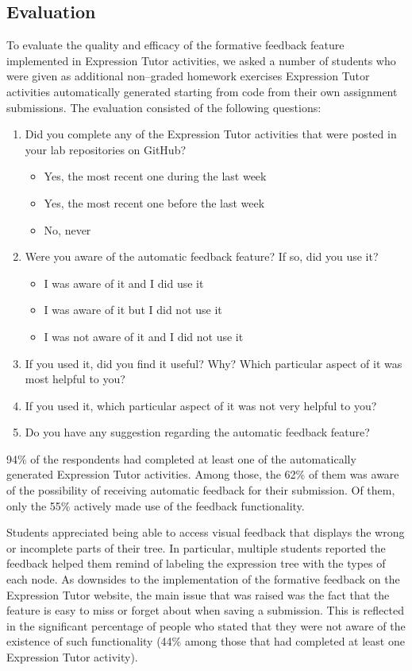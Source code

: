 \begin{chapterBody}
\subsection{Evaluation}

To evaluate the quality and efficacy of the formative feedback feature
implemented in Expression Tutor activities, we asked a number of
students who were given as additional non–graded homework exercises
Expression Tutor activities automatically generated starting from
code from their own assignment submissions.
The evaluation consisted of the following questions:

\begin{enumerate}
    \item Did you complete any of the Expression Tutor activities that
were posted in your lab repositories on GitHub?
    \begin{itemize}
        \item Yes, the most recent one during the last week
        \item Yes, the most recent one before the last week
        \item No, never
    \end{itemize}
    \item Were you aware of the automatic feedback feature? If so,
did you use it?
    \begin{itemize}
        \item I was aware of it and I did use it
        \item I was aware of it but I did not use it
        \item I was not aware of it and I did not use it
    \end{itemize}
    \item If you used it, did you find it useful? Why? Which
particular aspect of it was most helpful to you?
    \item If you used it, which particular aspect of it was not
very helpful to you?
    \item Do you have any suggestion regarding the automatic feedback
feature?
\end{enumerate}

94\% of the respondents had completed at least one of the automatically
generated Expression Tutor activities. Among those, the 62\% of them
was aware of the possibility of receiving automatic feedback for their
submission. Of them, only the 55\% actively made use of the feedback
functionality.

Students appreciated being able to access visual feedback that displays the
wrong or incomplete parts of their tree. In particular, multiple students
reported the feedback helped them remind of labeling the expression tree with
the types of each node.
As downsides to the implementation of the formative feedback on the Expression
Tutor website, the main issue that was raised was the fact that the feature is
easy to miss or forget about when saving a submission. This is reflected in the
significant percentage of people who stated that they were not aware of the 
existence of such functionality (44\% among those that had completed at least one
Expression Tutor activity).


\end{chapterBody}
